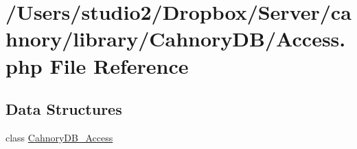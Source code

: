 \hypertarget{_access_8php}{
\section{/Users/studio2/Dropbox/Server/cahnory/library/CahnoryDB/Access.php File Reference}
\label{_access_8php}
}
\subsection*{Data Structures}
\begin{CompactItemize}
\item 
class \hyperlink{class_cahnory_d_b___access}{CahnoryDB\_\-Access}
\end{CompactItemize}
